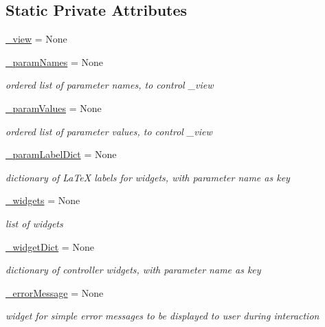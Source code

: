 \subsection*{Static Private Attributes}
\begin{DoxyCompactItemize}
\item 
\hyperlink{class_mu_mo_t_1_1_mu_mo_tcontroller_a27dd8543b5188cdfe40f622d267fe2c5}{\+\_\+view} = None
\item 
\hyperlink{class_mu_mo_t_1_1_mu_mo_tcontroller_ac7734326ac8dbbf9bd0d2c9838633195}{\+\_\+param\+Names} = None
\begin{DoxyCompactList}\small\item\em ordered list of parameter names, to control \+\_\+view \end{DoxyCompactList}\item 
\hyperlink{class_mu_mo_t_1_1_mu_mo_tcontroller_a04608181fa27d9aad4983d3694f7ab17}{\+\_\+param\+Values} = None
\begin{DoxyCompactList}\small\item\em ordered list of parameter values, to control \+\_\+view \end{DoxyCompactList}\item 
\hyperlink{class_mu_mo_t_1_1_mu_mo_tcontroller_a13bcda33e0e971cf4ad2710945226add}{\+\_\+param\+Label\+Dict} = None
\begin{DoxyCompactList}\small\item\em dictionary of La\+TeX labels for widgets, with parameter name as key \end{DoxyCompactList}\item 
\hyperlink{class_mu_mo_t_1_1_mu_mo_tcontroller_a397d0ee37a222317a1bab7deb1270a13}{\+\_\+widgets} = None
\begin{DoxyCompactList}\small\item\em list of widgets \end{DoxyCompactList}\item 
\hyperlink{class_mu_mo_t_1_1_mu_mo_tcontroller_a76e960ae74fc597cd22f7132507eaa20}{\+\_\+widget\+Dict} = None
\begin{DoxyCompactList}\small\item\em dictionary of controller widgets, with parameter name as key \end{DoxyCompactList}\item 
\hyperlink{class_mu_mo_t_1_1_mu_mo_tcontroller_afb9cc1f1f0c08393b454f526842425cc}{\+\_\+error\+Message} = None
\begin{DoxyCompactList}\small\item\em widget for simple error messages to be displayed to user during interaction \end{DoxyCompactList}\item 

\end{DoxyCompactItemize}

